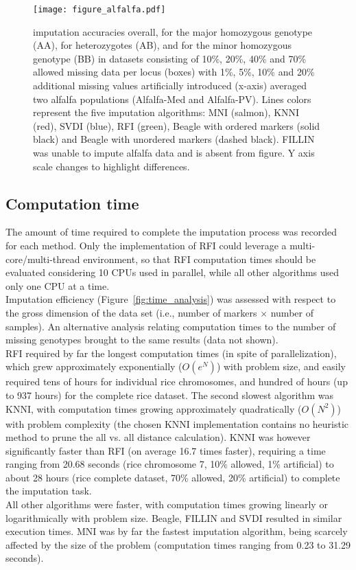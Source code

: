 \begin{figure}
\texttt{[image: figure\_alfalfa.pdf]}
\caption[Alfalfa imputation accuracies]{
imputation accuracies overall, for the major homozygous genotype (AA), for heterozygotes (AB), and for the minor homozygous genotype (BB) in datasets consisting of 10\%, 20\%, 40\% and 70\% allowed missing data per locus (boxes) with 1\%, 5\%, 10\% and 20\% additional missing values artificially introduced (x-axis) averaged two alfalfa populations (Alfalfa-Med and Alfalfa-PV). Lines colors represent the five imputation algorithms: MNI (salmon), KNNI (red), SVDI (blue), RFI (green), Beagle with ordered markers (solid black) and Beagle with unordered markers (dashed black). FILLIN was unable to impute alfalfa data and is absent from figure. Y axis scale changes to highlight differences.}
\label{fig:accuracy_alfalfa}
\end{figure}

\subsection{Computation time}
\label{sec:computation_time}  
The amount of time required to complete the imputation process was recorded for each method. Only the implementation of RFI could leverage a multi-core/multi-thread environment, so that RFI computation times should be evaluated considering 10 CPUs used in parallel, while all other algorithms used only one CPU at a time.\\
Imputation efficiency (Figure~\ref{fig:time_analysis}) was assessed with respect to the gross dimension of the data set (i.e., number of markers $\times$ number of samples). An alternative analysis relating computation times to the number of missing genotypes brought to the same results (data not shown).\\
RFI required by far the longest computation times (in spite of parallelization), which grew approximately exponentially ($O(e^N)$) with problem size, and easily required tens of hours for individual rice chromosomes, and hundred of hours (up to 937 hours) for the complete rice dataset. The second slowest algorithm was KNNI, with computation times growing approximately quadratically ($O(N^2)$) with problem complexity (the chosen KNNI implementation contains no heuristic method to prune the all vs. all distance calculation). KNNI was however significantly faster than RFI (on average 16.7 times faster), requiring a time ranging from 20.68 seconds (rice chromosome 7, 10\% allowed, 1\% artificial) to about 28 hours (rice complete dataset, 70\% allowed, 20\% artificial) to complete the imputation task.\\
All other algorithms were faster, with computation times growing linearly or logarithmically with problem size. Beagle, FILLIN and SVDI resulted in similar execution times. MNI was by far the fastest imputation algorithm, being scarcely affected by the size of the problem (computation times ranging from 0.23 to 31.29 seconds).

